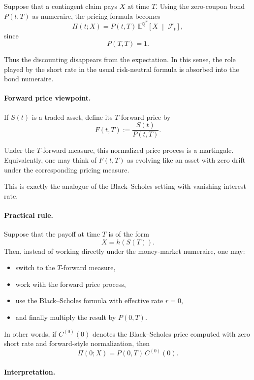 \documentclass[11pt]{article}
\newcommand{\F}{\mathcal{F}}
\newcommand{\Qbb}{\mathbb{Q}}
\newcommand{\E}{\mathbb{E}}
\theoremstyle{definition}
\theoremstyle{plain}
\begin{document}
Suppose that a contingent claim pays \(X\) at time \(T\).
Using the zero-coupon bond \(P(t,T)\) as numeraire, the pricing formula
becomes
\[
\Pi(t;X)
=
P(t,T)\,
\E^{\Qbb^T}\!\left[
X
\;\middle|\;
\F_t
\right],
\]
since
\[
P(T,T)=1.
\]

Thus the discounting disappears from the expectation.
In this sense, the role played by the short rate in the usual
risk-neutral formula is absorbed into the bond numeraire.

\paragraph{Forward price viewpoint.}

If \(S(t)\) is a traded asset, define its \(T\)-forward price by
\[
F(t,T):=\frac{S(t)}{P(t,T)}.
\]

Under the \(T\)-forward measure, this normalized price process is a
martingale.
Equivalently, one may think of \(F(t,T)\) as evolving like an asset with
zero drift under the corresponding pricing measure.

This is exactly the analogue of the Black--Scholes setting with
vanishing interest rate.

\paragraph{Practical rule.}

Suppose that the payoff at time \(T\) is of the form
\[
X=h(S(T)).
\]
Then, instead of working directly under the money-market numeraire, one
may:
\begin{itemize}[leftmargin=1.4em]
\item switch to the \(T\)-forward measure,
\item work with the forward price process,
\item use the Black--Scholes formula with effective rate \(r=0\),
\item and finally multiply the result by \(P(0,T)\).
\end{itemize}

In other words, if \(C^{(0)}(0)\) denotes the Black--Scholes price
computed with zero short rate and forward-style normalization, then
\[
\boxed{
\Pi(0;X)=P(0,T)\,C^{(0)}(0).
}
\]

\paragraph{Interpretation.}
\end{document}

